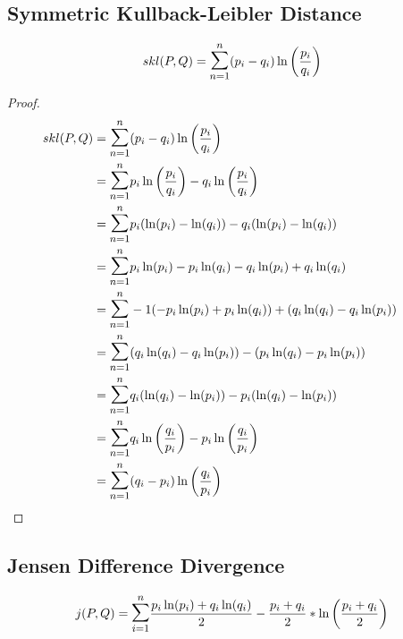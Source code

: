 \documentclass[10pt,a4paper]{article}
\begin{document}
\subsection{Symmetric Kullback-Leibler Distance}
\begin{equation}
  skl(P,Q) = \mathlarger{\mathlarger{\sum}}\limits_{n=1}^n (p_i-q_i) \ln \left(\frac{p_i}{q_i}\right)
\end{equation}
\begin{proof}
\begin{align*}
  skl(P,Q)  &= \mathlarger{\mathlarger{\sum}}\limits_{n=1}^n (p_i-q_i) \ln \left(\frac{p_i}{q_i}\right) \\
            &= \mathlarger{\mathlarger{\sum}}\limits_{n=1}^n p_i \ln \left(\frac{p_i}{q_i}\right) - q_i \ln \left(\frac{p_i}{q_i}\right) \\
            &= \mathlarger{\mathlarger{\sum}}\limits_{n=1}^n p_i( \ln(p_i) - \ln(q_i) ) - q_i( \ln(p_i) - \ln(q_i) ) \\
            &= \mathlarger{\mathlarger{\sum}}\limits_{n=1}^n p_i\ln(p_i) - p_i\ln(q_i) - q_i\ln(p_i) +q_i\ln(q_i) \\
            &= \mathlarger{\mathlarger{\sum}}\limits_{n=1}^n -1(-p_i\ln(p_i) + p_i\ln(q_i)) + ( q_i\ln(q_i) - q_i\ln(p_i) ) \\
            &= \mathlarger{\mathlarger{\sum}}\limits_{n=1}^n ( q_i\ln(q_i) - q_i\ln(p_i) ) - (p_i\ln(q_i) - p_i\ln(p_i)) \\
            &= \mathlarger{\mathlarger{\sum}}\limits_{n=1}^n q_i( \ln(q_i) - \ln(p_i) ) - p_i( \ln(q_i) - \ln(p_i) ) \\
            &= \mathlarger{\mathlarger{\sum}}\limits_{n=1}^n q_i \ln \left(\frac{q_i}{p_i}\right) - p_i \ln \left(\frac{q_i}{p_i}\right) \\
            &= \mathlarger{\mathlarger{\sum}}\limits_{n=1}^n (q_i - p_i) \ln \left(\frac{q_i}{p_i}\right) &&\qedhere
\end{align*}
\end{proof}


\subsection{Jensen Difference Divergence}
\begin{equation}
  j(P,Q) = \mathlarger{\mathlarger{\sum}}\limits_{i=1}^n \frac{p_i \ln(p_i) + q_i \ln(q_i)}{2} - \frac{p_i+q_i}{2} * \ln\left( \frac{p_i+q_i}{2} \right)
\end{equation}
\end{document}
